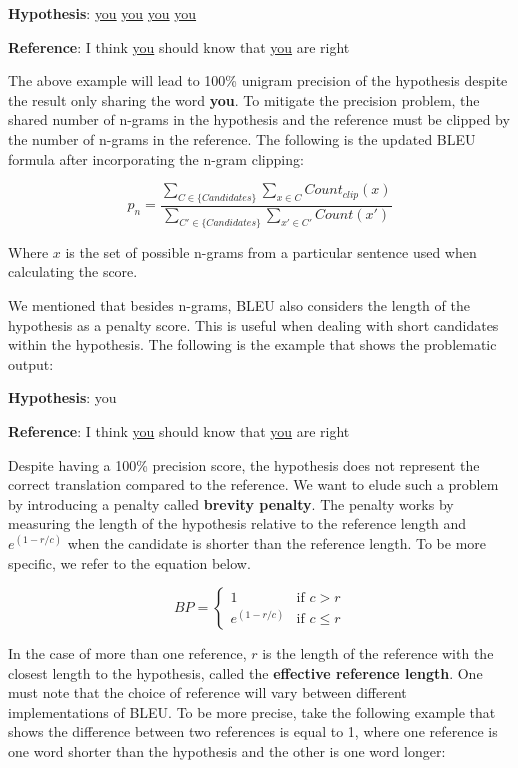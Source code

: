 \bigskip

\textbf{Hypothesis}: \underline{you} \underline{you} \underline{you} \underline{you}

\textbf{Reference}: I think \underline{you} should know that \underline{you} are right

\bigskip

The above example will lead to 100\% unigram precision of the hypothesis despite the result only sharing the word \textbf{you}. To mitigate the precision problem, the shared number of n-grams in the hypothesis and the reference must be clipped by the number of n-grams in the reference. The following is the updated BLEU formula after incorporating the n-gram clipping:

\begin{equation}
    p_n=\frac{\sum_{C\in\{Candidates\}}\sum_{x\in C}Count_{clip}(x)}{\sum_{C'\in\{Candidates\}}\sum_{x'\in C'}Count(x')}
\end{equation}

Where $x$ is the set of possible n-grams from a particular sentence used when calculating the score.

We mentioned that besides n-grams, BLEU also considers the length of the hypothesis as a penalty score. This is useful when dealing with short candidates within the hypothesis. The following is the example that shows the problematic output:

\bigskip

\textbf{Hypothesis}: you

\textbf{Reference}: I think \underline{you} should know that \underline{you} are right

\bigskip

Despite having a 100\% precision score, the hypothesis does not represent the correct translation compared to the reference. We want to elude such a problem by introducing a penalty called \textbf{brevity penalty}. The penalty works by measuring the length of the hypothesis relative to the reference length and  $e^{(1-r/c)}$ when the candidate is shorter than the reference length. To be more specific, we refer to the equation below.

\begin{equation}
    BP=\begin{cases} 1 & \mbox{if } c>r \\ e^{(1-r/c)} & \mbox{if } c\le r \end{cases}
\end{equation}

In the case of more than one reference, $r$ is the length of the reference with the closest length to the hypothesis, called the \textbf{effective reference length}. One must note that the choice of reference will vary between different implementations of BLEU. To be more precise, take the following example that shows the difference between two references is equal to 1, where one reference is one word shorter than the hypothesis and the other is one word longer:

